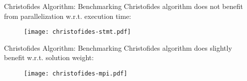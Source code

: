 \begin{frame}[t]{Christofides Algorithm: Benchmarking}
  \vfill
  Christofides algorithm does not benefit from parallelization w.r.t. execution time:
  
  \begin{figure}
    \texttt{[image: christofides-stmt.pdf]}
  \end{figure}
  \vfill
\end{frame}

\begin{frame}[t]{Christofides Algorithm: Benchmarking}
  \vfill
  Christofides algorithm does slightly benefit w.r.t. solution weight:
  
  \begin{figure}
    \texttt{[image: christofides-mpi.pdf]}
  \end{figure}
  \vfill
\end{frame}
